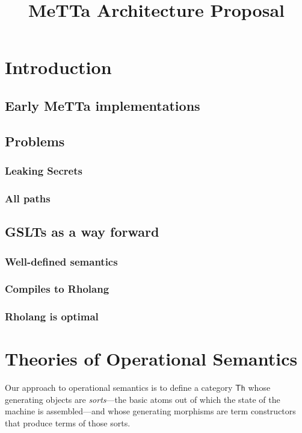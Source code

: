 \documentclass{article}
\title{MeTTa Architecture Proposal}
\author{}
\date{}
\begin{document}
\maketitle

\section{Introduction}

\subsection{Early MeTTa implementations}

\subsection{Problems}

\subsubsection{Leaking Secrets}

\subsubsection{All paths}

\subsection{GSLTs as a way forward}

\subsubsection{Well-defined semantics}

\subsubsection{Compiles to Rholang}

\subsubsection{Rholang is optimal}

\section{Theories of Operational Semantics}

Our approach to operational semantics is to define a category $\mathsf{Th}$ whose generating objects are \emph{sorts}---the basic atoms out of which the state of the machine is assembled---and whose generating morphisms are term constructors that produce terms of those sorts.
\end{document}

